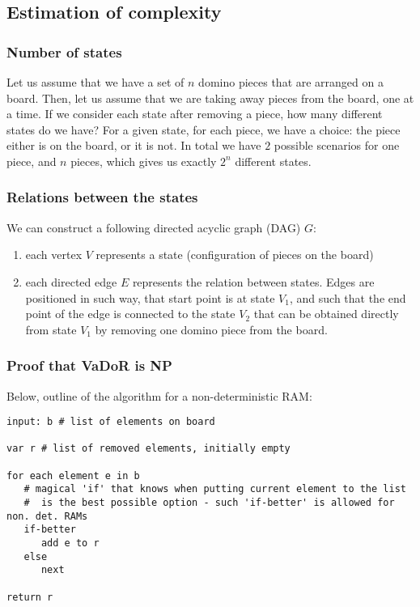 \subsection{Estimation of complexity}

\subsubsection{Number of states}
Let us assume that we have a set of $n$ domino pieces that are arranged on a board. Then, 
let us assume that we are taking away pieces from the board, one at a time. If we consider each 
state after removing a piece, how many different states do we have? For a given state, for each piece, 
we have a choice: the piece either is on the board, or it is not. In total we have $2$ possible scenarios
for one piece, and $n$ pieces, which gives us exactly $2^n$ different states.

\subsubsection{Relations between the states}
We can construct a following directed acyclic graph (DAG) $G$:
\begin{enumerate}
  \item each vertex $V$ represents a state (configuration of pieces on the board)
  \item each directed edge $E$ represents the relation between states. Edges 
  are positioned in such way, that start point is at state $V_1$, and such that 
  the end point of the edge is connected to the state $V_2$ that can be obtained 
  directly from state $V_1$ by removing one domino piece from the board.
\end{enumerate}

\subsubsection{Proof that VaDoR is NP}

Below, outline of the algorithm for a non-deterministic RAM:

\begin{verbatim}
input: b # list of elements on board

var r # list of removed elements, initially empty

for each element e in b
   # magical 'if' that knows when putting current element to the list 
   #  is the best possible option - such 'if-better' is allowed for non. det. RAMs
   if-better 
      add e to r
   else
      next

return r

\end{verbatim}

